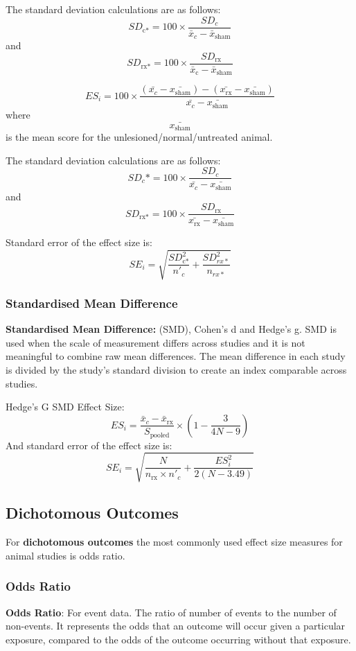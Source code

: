 \documentclass[
]{book}
\begin{document}
The standard deviation calculations are as follows:
\[SD_\text{c*} = 100 \times \frac {SD_c}{\bar{x}_c - \bar{x}_\text{sham}}\] and \[SD_\text{rx*} = 100 \times \frac {SD_\text{rx}}{\bar{x}_\text{c} - \bar{x}_\text{sham}}\]

\[ES_i= 100 \times  \frac {(\bar{x_c} - \bar{x_\text{sham}}) - (\bar{x_\text{rx}} - \bar{x_\text{sham}})}{\bar{x_c} - \bar{x_\text{sham}}} \] where \[\bar{x_\text{sham}} \] is the mean score for the unlesioned/normal/untreated animal.

The standard deviation calculations are as follows:
\[SD_c* = 100 \times \frac {SD_c}{\bar{x_c} - \bar{x_\text{sham}}}\] and \[SD_\text{rx*} = 100 \times \frac {SD_\text{rx}}{\bar{x_\text{rx}} - \bar{x_\text{sham}}}\]

Standard error of the effect size is:
\[SE_i = \sqrt{ \frac{SD_\text{c*}^2}{n'_c} + \frac {SD_{rx*}^2}{n_{rx*}} }\]

\subsubsection{Standardised Mean Difference}\label{standardised-mean-difference}

\textbf{Standardised Mean Difference:} (SMD), Cohen's d and Hedge's g. SMD is used when the scale of measurement differs across studies and it is not meaningful to combine raw mean differences. The mean difference in each study is divided by the study's standard division to create an index comparable across studies.

Hedge's G SMD Effect Size:
\[ES_i = \frac {\bar{x}_c - \bar{x}_\text{rx}}{S_{\text{pooled}}} \times (1 - \frac{3}{4N - 9})  \]
And standard error of the effect size is:
\[ SE_i = \sqrt{ \frac{N}{n_{\text{rx}} \times n'_c} + \frac{ES_i^2}{2(N - 3.49)} }\]

\subsection{Dichotomous Outcomes}\label{dichotomous-outcomes}

For \textbf{dichotomous outcomes} the most commonly used effect size measures for animal studies is odds ratio.

\subsubsection{Odds Ratio}\label{odds-ratio}

\textbf{Odds Ratio}: For event data. The ratio of number of events to the number of non-events. It represents the odds that an outcome will occur given a particular exposure, compared to the odds of the outcome occurring without that exposure.
\end{document}
